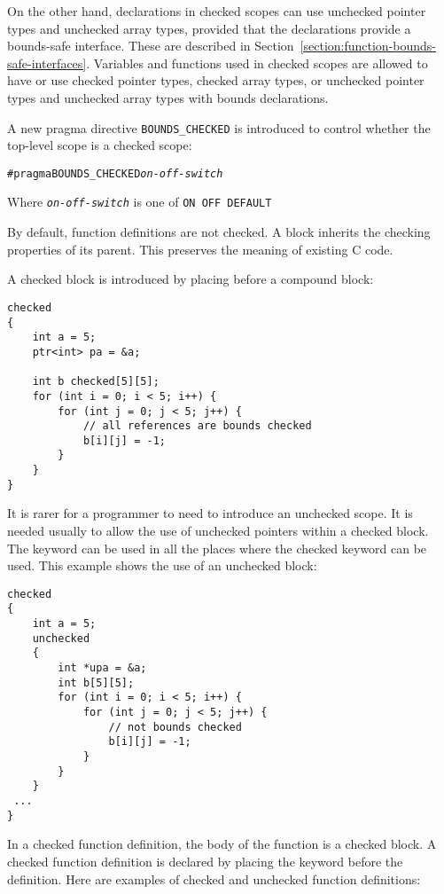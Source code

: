 On the other hand,  declarations in checked scopes can use unchecked pointer
types and unchecked array types, provided that the declarations provide a
bounds-safe interface.   These are described in
Section~\ref{section:function-bounds-safe-interfaces}.
Variables and functions used in checked scopes are 
allowed to have or use checked pointer types, checked array types, or
unchecked pointer types and unchecked array types with bounds declarations.

A new pragma directive \texttt{BOUNDS\_CHECKED} is introduced to control whether
the top-level scope is a checked scope:
\begin{alltt}
#pragma BOUNDS_CHECKED \textit{on-off-switch}
\end{alltt}

Where \texttt{\textit{on-off-switch}} is one of \verb|ON OFF DEFAULT|

By default, function definitions are not checked. A block inherits the
checking properties of its parent. This preserves the meaning of
existing C code.

A checked block is introduced by placing   before a
compound block:
\begin{verbatim}
checked 
{
    int a = 5;
    ptr<int> pa = &a;

    int b checked[5][5];
    for (int i = 0; i < 5; i++) {
        for (int j = 0; j < 5; j++) {
            // all references are bounds checked
            b[i][j] = -1;
        }
    }
}
\end{verbatim}

It is rarer for a programmer to need to introduce an unchecked scope. It
is needed usually to allow the use of unchecked pointers within a checked
block. The  keyword can be used in all the places where the
checked keyword can be used. This example shows the use of an unchecked
block:

\begin{verbatim}
checked 
{
    int a = 5;
    unchecked 
    {
        int *upa = &a;	
        int b[5][5];
        for (int i = 0; i < 5; i++) {
            for (int j = 0; j < 5; j++) {
                // not bounds checked
                b[i][j] = -1;
            }
        }     
    }
 ...
}
\end{verbatim}

In a checked function definition, the body of the function is a 
checked  block. A checked function definition is declared by placing the
 keyword before the definition. Here are examples of checked and
unchecked function definitions:

